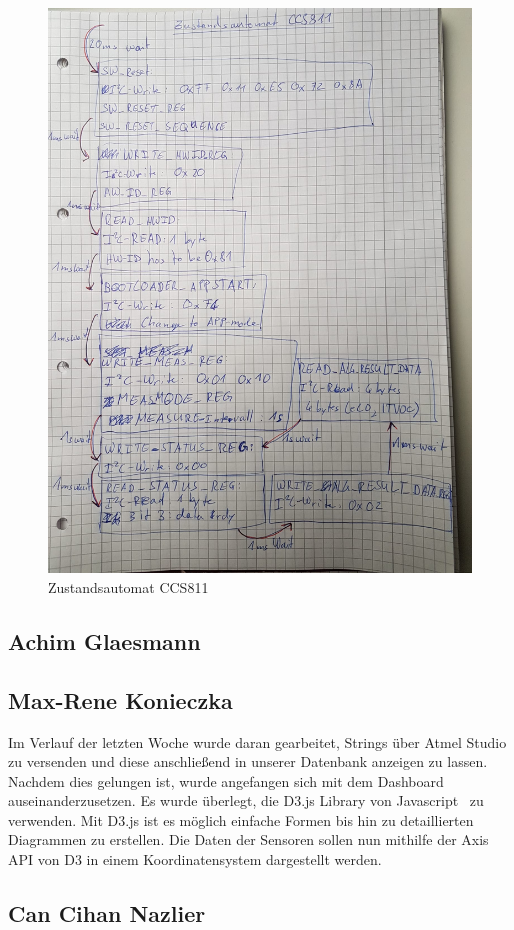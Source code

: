 \documentclass[]{article}
\begin{document}
\begin{figure}[h]
	\centering
	\includegraphics[scale=0.20]{images/zustandsautomat_ccs811}
	\caption{Zustandsautomat CCS811}
	\label{img:Zustandsautomat}
\end{figure}

\subsection{Achim Glaesmann}


\subsection{Max-Rene Konieczka}
Im Verlauf der letzten Woche wurde daran gearbeitet, Strings über Atmel Studio zu versenden und diese anschließend in unserer Datenbank anzeigen zu lassen. Nachdem dies gelungen ist, wurde angefangen sich mit dem Dashboard auseinanderzusetzen. Es wurde überlegt, die D3.js Library von Javascript~\cite{D3JS} zu verwenden. Mit D3.js ist es möglich einfache Formen bis hin zu detaillierten Diagrammen zu erstellen.
Die Daten der Sensoren sollen nun mithilfe der Axis API von D3 in einem Koordinatensystem dargestellt werden. 
\subsection{Can Cihan Nazlier}


\printbibliography
\end{document}
